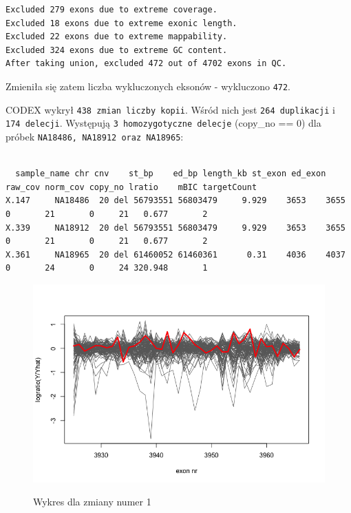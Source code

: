 \documentclass[a4paper]{article}
\begin{document}
\begin{verbatim}
Excluded 279 exons due to extreme coverage.
Excluded 18 exons due to extreme exonic length.
Excluded 22 exons due to extreme mappability.
Excluded 324 exons due to extreme GC content.
After taking union, excluded 472 out of 4702 exons in QC.
\end{verbatim}
Zmieniła się zatem liczba wykluczonych eksonów - wykluczono \texttt{472}.

CODEX wykrył \texttt{438 zmian liczby kopii}. Wśród nich jest \texttt{264 duplikacji} i \texttt{174 delecji}.
Występują \texttt{3 homozygotyczne delecje} (copy\_no == 0) dla próbek \texttt{NA18486, NA18912 oraz NA18965}:
\footnotesize
\begin{verbatim}

  sample_name chr cnv    st_bp    ed_bp length_kb st_exon ed_exon raw_cov norm_cov copy_no lratio    mBIC targetCount
X.147     NA18486  20 del 56793551 56803479     9.929    3653    3655       0       21       0     21   0.677       2
X.339     NA18912  20 del 56793551 56803479     9.929    3653    3655       0       21       0     21   0.677       2
X.361     NA18965  20 del 61460052 61460361      0.31    4036    4037       0       24       0     24 320.948       1
\end{verbatim}

\begin{figure}[h]
    \centering
    \includegraphics[width=1.0\textwidth]{plot_change_no_1.png}
    \label{fig:igv}
    \caption[]{Wykres dla zmiany numer 1}
\end{figure}
\end{document}
